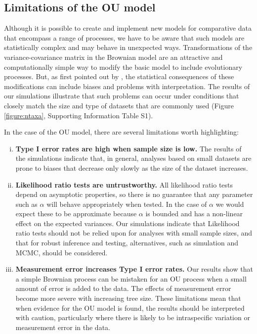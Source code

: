 \documentclass[a4paper,12pt]{article}
\begin{document}
  \subsection{Limitations of the OU model}
  Although it is possible to create and implement new models for comparative data that encompass a range of processes, we have to be aware that such models are statistically complex and may behave in unexpected ways. 
  Transformations of the variance-covariance matrix in the Brownian model \citep[e.g. $\lambda$;][]{Pagel:1997aa} are an attractive and computationally simple way to modify the basic model to include evolutionary processes. 
  But, as first pointed out by \citet{grafen1989phylogenetic}, the statistical consequences of these modifications can include biases and problems with interpretation. 
  The results of our simulations illustrate that such problems can occur under conditions that closely match the size and type of datasets that are commonly used (Figure \ref{figure:ntaxa}, Supporting Information Table S1).
  
  In the case of the OU model, there are several limitations worth highlighting:
\begin{enumerate}[(i)]
  \item \textbf{Type I error rates are high when sample size is low.} 
  The results of the simulations indicate that, in general, analyses based on small datasets are prone to biases that decrease only slowly as the size of the dataset increases.  
  \item \textbf{Likelihood ratio tests are untrustworthy.}
  All likelihood ratio tests depend on asymptotic properties, so there is no guarantee that any parameter such as $\alpha$ will behave appropriately when tested. 
  In the case of $\alpha$ we would expect these to be approximate because $\alpha$ is bounded and has a non-linear effect on the expected variances. 
  Our simulations indicate that Likelihood ratio tests should not be relied upon for analyses with small sample sizes, and that for robust inference and testing, alternatives, such as simulation and MCMC, should be considered. 
  \item \textbf{Measurement error increases Type I error rates.} 
  Our results show that a simple Brownian process can be mistaken for an OU process when a small amount of error is added to the data. 
  The effects of measurement error become more severe with increasing tree size.
  These limitations mean that when evidence for the OU model is found, the results should be interpreted with caution, particularly where there is likely to be intraspecific variation or measurement error in the data.
\end{enumerate}
\end{document}
